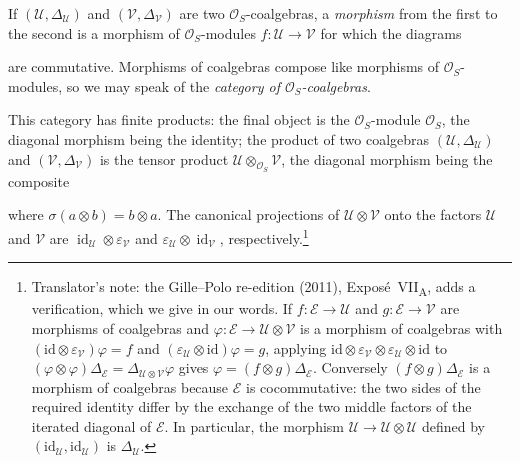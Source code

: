 If \((\mathcal U,\Delta_{\mathcal U})\) and
\((\mathcal V,\Delta_{\mathcal V})\) are two
\(\mathcal O_S\)-coalgebras, a \emph{morphism} from the first to the
second is a morphism of \(\mathcal O_S\)-modules
\(f:\mathcal U\to\mathcal V\) for which the diagrams
\begin{center}
  \label{sga3:VIIA:3.1-coalgebra-morphism-diagrams}
  
\end{center}
are commutative. Morphisms of coalgebras compose like morphisms of
\(\mathcal O_S\)-modules, so we may speak of the
\emph{category of \(\mathcal O_S\)-coalgebras}.

This category has finite products: the final object is the
\(\mathcal O_S\)-module \(\mathcal O_S\), the diagonal morphism being the
identity; the product of two coalgebras
\((\mathcal U,\Delta_{\mathcal U})\) and
\((\mathcal V,\Delta_{\mathcal V})\) is the tensor product
\(\mathcal U\otimes_{\mathcal O_S}\mathcal V\), the diagonal morphism
being the composite
\begin{center}
  \label{sga3:VIIA:3.1.0-product-comultiplication}
  
\end{center}
where \(\sigma(a\otimes b)=b\otimes a\). The canonical projections
of \(\mathcal U\otimes\mathcal V\) onto the factors
\(\mathcal U\) and \(\mathcal V\) are
\(\operatorname{id}_{\mathcal U}\otimes\varepsilon_{\mathcal V}\)
and
\(\varepsilon_{\mathcal U}\otimes\operatorname{id}_{\mathcal V}\),
respectively.\footnote{Translator's note: the Gille--Polo re-edition
(2011), Expos\'e~VII\textsubscript{A}, adds a verification, which we give
in our words. If \(f:\mathcal E\to\mathcal U\) and
\(g:\mathcal E\to\mathcal V\) are morphisms of coalgebras and
\(\varphi:\mathcal E\to\mathcal U\otimes\mathcal V\) is a morphism of
coalgebras with \((\mathrm{id}\otimes\varepsilon_{\mathcal V})\varphi=f\)
and \((\varepsilon_{\mathcal U}\otimes\mathrm{id})\varphi=g\), applying
\(\mathrm{id}\otimes\varepsilon_{\mathcal V}\otimes
\varepsilon_{\mathcal U}\otimes\mathrm{id}\) to
\((\varphi\otimes\varphi)\Delta_{\mathcal E}=
\Delta_{\mathcal U\otimes\mathcal V}\varphi\) gives
\(\varphi=(f\otimes g)\Delta_{\mathcal E}\). Conversely
\((f\otimes g)\Delta_{\mathcal E}\) is a morphism of coalgebras because
\(\mathcal E\) is cocommutative: the two sides of the required identity
differ by the exchange of the two middle factors of the iterated
diagonal of \(\mathcal E\). In particular, the morphism
\(\mathcal U\to\mathcal U\otimes\mathcal U\) defined by
\((\mathrm{id}_{\mathcal U},\mathrm{id}_{\mathcal U})\) is
\(\Delta_{\mathcal U}\).}

